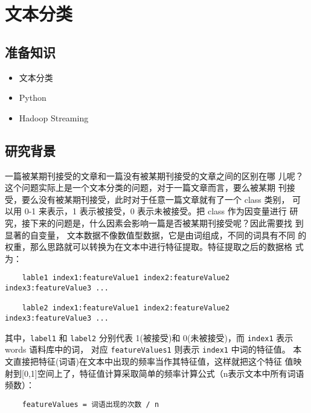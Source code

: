 \section{文本分类}\label{ux5b9eux4f8bux5206ux6790ux6587ux672cux5206ux7c7b}

\subsection{准备知识}\label{ux51c6ux5907ux77e5ux8bc6}

\begin{itemize}
\itemsep1pt\parskip0pt
\item
  文本分类
\item
  Python
\item
  Hadoop Streaming
\end{itemize}

\subsection{研究背景}\label{ux7814ux7a76ux80ccux666f}

一篇被某期刊接受的文章和一篇没有被某期刊接受的文章之间的区别在哪
儿呢？这个问题实际上是一个文本分类的问题，对于一篇文章而言，要么被某期
刊接受，要么没有被某期刊接受，此时对于任意一篇文章就有了一个 class 类别，
可以用 0-1 来表示，1 表示被接受，0 表示未被接受。把 class 作为因变量进行
研究，接下来的问题是，什么因素会影响一篇是否被某期刊接受呢？因此需要找
到显著的自变量， 文本数据不像数值型数据，它是由词组成，不同的词具有不同
的权重，那么思路就可以转换为在文本中进行特征提取。特征提取之后的数据格
式为：

\begin{lstlisting}
	lable1 index1:featureValue1 index2:featureValue2 index3:featureValue3 ...

	lable2 index1:featureValue1 index2:featureValue2 index3:featureValue3 ...
\end{lstlisting}

其中，\lstinline|label1| 和 \lstinline|label2| 分别代表 1(被接受)和 0(未被接受)，而 \lstinline!index1! 表示
words 语料库中的词， 对应 \lstinline|featureValues1| 则表示 \lstinline|index1| 中词的特征值。
本文直接把特征(词语)在文本中出现的频率当作其特征值，这样就把这个特征
值映射到{[}0,1{]}空间上了，特征值计算采取简单的频率计算公式（n表示文本中所有词语频数）：

\begin{lstlisting}
	featureValues = 词语出现的次数 / n
\end{lstlisting}

